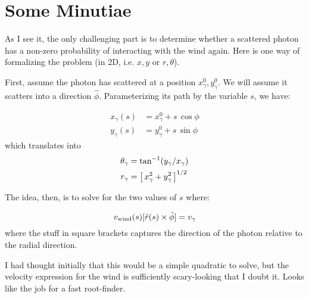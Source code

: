 \documentclass[12pt,preprint]{aastex}
\begin{document}
\section{Some Minutiae}

As I see it, the only challenging part is to determine whether a
scattered photon has a non-zero probability of interacting with the
wind again.  Here is one way of formalizing the problem (in 2D,
i.e. $x,y$ or $r,\theta$).

First, assume the photon has scattered at a position
$x_\gamma^0,y_\gamma^0$.  We will assume it scatters into a direction
$\hat \phi$.  Parameterizing its path by the variable $s$, we have:

\begin{align}
x_\gamma(s) &= x^0_\gamma + s \, \cos\phi \\
y_\gamma(s) &= y^0_\gamma + s \, \sin\phi
\end{align}
which translates into
\begin{align}
\theta_\gamma &= \tan^{-1}(y_\gamma/x_\gamma) \\
r_\gamma &= \left [ \, x_\gamma^2 + y_\gamma^2 \, \right ]^{1/2}
\end{align}

The idea, then, is to solve for the two values of $s$ where:

\begin{equation}
v_{\rm wind}(s) [\hat r(s) \times \hat \phi] = v_\gamma
\end{equation}
where the stuff in square brackets captures the direction of the
photon relative to the radial direction.

I had thought initially that this would be a simple quadratic to
solve, but the velocity expression for the wind is sufficiently
scary-looking that I doubt it.  Looks like the job for a fast root-finder.




\end{document}
